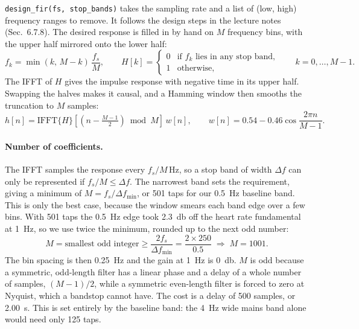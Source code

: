 \documentclass[11pt,a4paper]{article}
\begin{document}
\texttt{design\_fir(fs, stop\_bands)} takes the sampling rate and a list of
(low, high) frequency ranges to remove. It follows the design steps in the
lecture notes (Sec.~6.7.8). The desired response is filled in by hand on $M$
frequency bins, with the upper half mirrored onto the lower half:
\begin{equation}
  f_k = \min(k,\,M-k)\,\frac{f_s}{M},
  \qquad
  H[k] =
  \begin{cases}
    0 & \text{if } f_k \text{ lies in any stop band,}\\
    1 & \text{otherwise,}
  \end{cases}
  \qquad k = 0,\dots,M-1.
  \label{eq:response}
\end{equation}
The IFFT of $H$ gives the impulse response with negative time in its upper
half. Swapping the halves makes it causal, and a Hamming window then smooths
the truncation to $M$ samples:
\begin{equation}
  h[n] = \mathrm{IFFT}\{H\}\!\left[\left(n-\tfrac{M-1}{2}\right)\bmod M\right]\,w[n],
  \qquad
  w[n] = 0.54 - 0.46\cos\frac{2\pi n}{M-1}.
  \label{eq:window}
\end{equation}

\paragraph{Number of coefficients.}
The IFFT samples the response every $f_s/M$\,Hz, so a stop band of width
$\Delta f$ can only be represented if $f_s/M \le \Delta f$. The narrowest band
sets the requirement, giving a minimum of $M = f_s/\Delta f_{\min}$, or 501
taps for our \SI{0.5}{\hertz} baseline band. This is only the best case,
because the window smears each band edge over a few bins. With 501 taps the
\SI{0.5}{\hertz} edge took \SI{2.3}{\decibel} off the heart rate fundamental at
\SI{1}{\hertz}, so we use twice the minimum, rounded up to the next odd number:
\begin{equation}
  M = \text{smallest odd integer} \ge \frac{2 f_s}{\Delta f_{\min}}
    = \frac{2\times 250}{0.5} \;\Rightarrow\; M = 1001.
  \label{eq:taps}
\end{equation}
The bin spacing is then \SI{0.25}{\hertz} and the gain at \SI{1}{\hertz} is
\SI{0}{\decibel}. $M$ is odd because a symmetric, odd-length filter has a
linear phase and a delay of a whole number of samples, $(M-1)/2$, while a
symmetric even-length filter is forced to zero at Nyquist, which a bandstop
cannot have. The cost is a delay of 500 samples, or \SI{2.00}{\second}. This is
set entirely by the baseline band: the \SI{4}{\hertz} wide mains band alone
would need only 125 taps.
\end{document}
